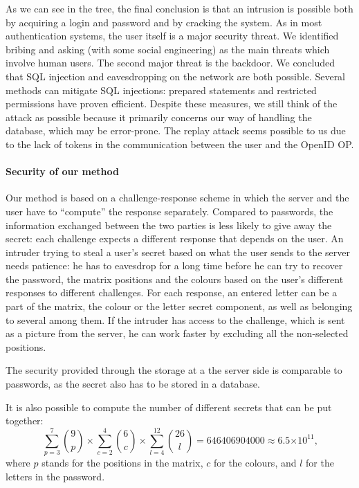 \documentclass[11pt,a4paper]{article}
\providecommand{\e}[1]{\ensuremath{\times 10^{#1}}}
\begin{document}
As we can see in the tree, the final conclusion is that an intrusion is possible both by acquiring a login and password and by cracking the system. As in most authentication systems, the user itself is a major security threat. We identified bribing and asking (with some social engineering) as the main threats which involve human users. The second major threat is the backdoor.
We concluded that SQL injection and eavesdropping on the network are both possible. Several methods can mitigate SQL injections: prepared statements and restricted permissions have proven efficient. Despite these measures, we still think of the attack as possible because it primarily concerns our way of handling the database, which may be error-prone.
The replay attack seems possible to us due to the lack of tokens in the communication between the user and the OpenID OP.

\paragraph{Security of our method}
Our method is based on a challenge-response scheme in which the server and the user have to ``compute'' the response separately.
Compared to passwords, the information exchanged between the two parties is less likely to give away the secret: each challenge expects a different response that depends on the user.
An intruder trying to steal a user's secret based on what the user sends to the server needs patience: he has to eavesdrop for a long time before he can try to recover the password, the matrix positions and the colours based on the user's different responses to different challenges. For each response, an entered letter can be a part of the matrix, the colour or the letter secret component, as well as belonging to several among them.
If the intruder has access to the challenge, which is sent as a picture from the server, he can work faster by excluding all the non-selected positions.

The security provided through the storage at a the server side is comparable to passwords, as the secret also has to be stored in a database.

It is also possible to compute the number of different secrets that can be put together:
$$ \sum\limits_{p=3}^{7}{9 \choose p} \times  \sum\limits_{c=2}^{4}{6 \choose c} \times \sum\limits_{l=4}^{12}{26 \choose l} = 646 406 904 000 \approx 6.5\e{11} \text{,}$$
where $p$ stands for the positions in the matrix, $c$ for the colours, and $l$ for the letters in the password.
\end{document}
